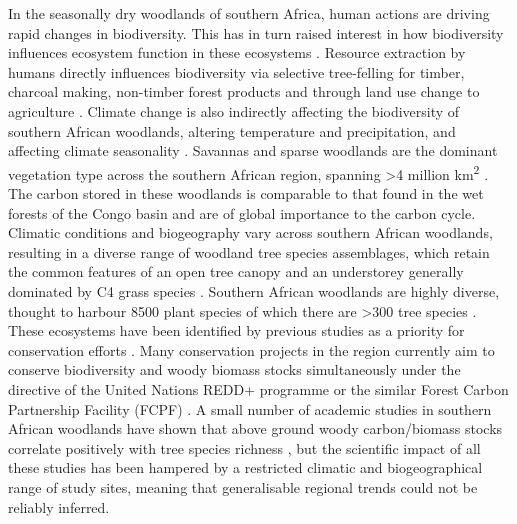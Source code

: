 \documentclass[11pt,a4paper]{article}
\begin{document}
In the seasonally dry woodlands of southern Africa, human actions are driving rapid changes in biodiversity. This has in turn raised interest in how biodiversity influences ecosystem function in these ecosystems \citep{}. Resource extraction by humans directly influences biodiversity via selective tree-felling for timber, charcoal making, non-timber forest products and through land use change to agriculture \citep{Ryan2016}. Climate change is also indirectly affecting the biodiversity of southern African woodlands, altering temperature and precipitation, and affecting climate seasonality \citep{}. Savannas and sparse woodlands are the dominant vegetation type across the southern African region, spanning >4 million km\textsuperscript{2} \citep{Ryan2016}. The carbon stored in these woodlands is comparable to that found in the wet forests of the Congo basin and are of global importance to the carbon cycle. Climatic conditions and biogeography vary across southern African woodlands, resulting in a diverse range of woodland tree species assemblages, which retain the common features of an open tree canopy and an understorey generally dominated by C4 grass species \citep{Frost1996}. Southern African woodlands are highly diverse, thought to harbour \textapprox{}8500 plant species of which there are >300 tree species \citep{Frost1996}. These ecosystems have been identified by previous studies as a priority for conservation efforts \citep{Brooks2006, Mittermeier2003, Frost1996}. Many conservation projects in the region currently aim to conserve biodiversity and woody biomass stocks simultaneously under the directive of the United Nations REDD+ programme or the similar Forest Carbon Partnership Facility (FCPF) \citep{Hinsley2015}. A small number of academic studies in southern African woodlands have shown that above ground woody carbon/biomass stocks correlate positively with tree species richness \citep{McNicol2018, and, others}, but the scientific impact of all these studies has been hampered by a restricted climatic and biogeographical range of study sites, meaning that generalisable regional trends could not be reliably inferred.  
\end{document}
